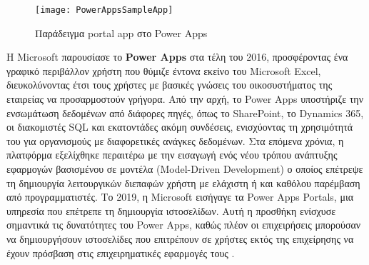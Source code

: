                 \begin{figure}[h!] \noindent \centering
                    \texttt{[image: PowerAppsSampleApp]}
                    \caption{\centering Παράδειγμα portal app στο Power Apps \cite{PowerAppsLeung}}
                    \label{fig:PowerAppsSampleApp}
                \end{figure}

                Η Microsoft παρουσίασε το \textbf{Power Apps} στα τέλη του 2016, προσφέροντας ένα γραφικό περιβάλλον χρήστη που θύμιζε έντονα εκείνο του Microsoft Excel, διευκολύνοντας έτσι τους χρήστες με βασικές γνώσεις του οικοσυστήματος της εταιρείας να προσαρμοστούν γρήγορα. Από την αρχή, το Power Apps υποστήριζε την ενσωμάτωση δεδομένων από διάφορες πηγές, όπως το SharePoint, το Dynamics 365, οι διακομιστές SQL και εκατοντάδες ακόμη συνδέσεις, ενισχύοντας τη χρησιμότητά του για οργανισμούς με διαφορετικές ανάγκες δεδομένων. Στα επόμενα χρόνια, η πλατφόρμα εξελίχθηκε περαιτέρω με την εισαγωγή ενός νέου τρόπου ανάπτυξης εφαρμογών βασισμένου σε μοντέλα (Model-Driven Development) ο οποίος επέτρεψε τη δημιουργία λειτουργικών διεπαφών χρήστη με ελάχιστη ή και καθόλου παρέμβαση από προγραμματιστές. Το 2019, η Microsoft εισήγαγε τα Power Apps Portals, μια υπηρεσία που επέτρεπε τη δημιουργία ιστοσελίδων. Αυτή η προσθήκη ενίσχυσε σημαντικά τις δυνατότητες του Power Apps, καθώς πλέον οι επιχειρήσεις μπορούσαν να δημιουργήσουν ιστοσελίδες που επιτρέπουν σε χρήστες εκτός της επιχείρησης να έχουν πρόσβαση στις επιχειρηματικές εφαρμογές τους \cite{PowerAppsLeung}.
